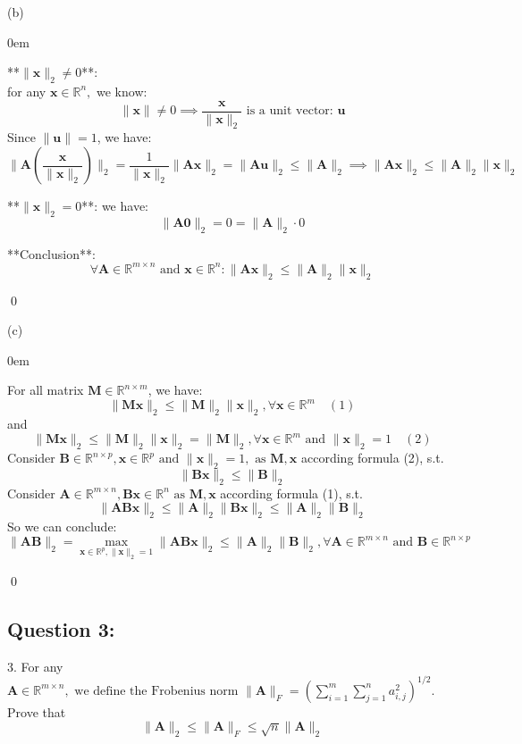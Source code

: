 \documentclass{article}
\newcommand{\R}{\mathbb{R}}
\renewenvironment{proof}{\begin{addmargin}[1em]{0em}\begin{newproof}}
{\end{newproof}\end{addmargin}\qed}
\begin{document}
(b)
\begin{proof}
    **\(\|\bm{x}\|_2 \neq 0\)**: \\
    for any \(\bm{x} \in \R^n, \) we know:
    \[
    \|\bm{x}\| \neq 0 \implies \frac{\bm{x}}{\|\bm{x}\|_2} \text{ is a unit vector: } \bm{u}
    \]
    Since \(\|\bm{u}\| = 1\), we have:
    \[
    \|\bm{A} (\frac{\bm{x}}{\|\bm{x}\|_2})\|_2 = \frac{1}{\|\bm{x}\|_2}\|\bm{A}\bm{x}\|_2 = \|\bm{A}\bm{u}\|_2 \leq \|\bm{A}\|_2 \implies \|\bm{A}\bm{x}\|_2 \leq \|\bm{A}\|_2\|\bm{x}\|_2
    \]

    **\(\|\bm{x}\|_2 = 0\)**:
    we have:
    \[
    \|\bm{A}\bm{0}\|_2 = 0 = \|\bm{A}\|_2 \cdot 0
    \]

    **Conclusion**:
    \[
    \forall \bm{A} \in \R^{m \times n} \text{ and } \bm{x} \in \R^n :
    \|\bm{A}\bm{x}\|_2 \leq \|\bm{A}\|_2\|\bm{x}\|_2
    \]

    
\end{proof}

(c)
\begin{proof}
    For all matrix \( \bm{M} \in \R^{n \times m}\), we have:
    \[
    \|\bm{M}\bm{x}\|_2 \leq \|\bm{M}\|_2\|\bm{x}\|_2 , \forall \bm{x} \in \R^m \quad (1)
    \]
    and 
    \[
    \|\bm{M}\bm{x}\|_2 \leq \|\bm{M}\|_2\|\bm{x}\|_2 = \|\bm{M}\|_2, \forall \bm{x} \in \R^m \text{ and } \|\bm{x}\|_2 = 1 \quad (2)
    \]
    Consider \(\bm{B} \in \R^{n \times p}, \bm{x} \in \R^p \text{ and } \|\bm{x}\|_2 = 1, \text{ as } \bm{M}, \bm{x} \) according formula (2), s.t.
    \[
    \|\bm{B}\bm{x}\|_2 \leq \|\bm{B}\|_2
    \]
    Consider \(\bm{A} \in \R^{m \times n}, \bm{B}\bm{x} \in \R^n \text{ as } \bm{M}, \bm{x} \) according formula (1), s.t.
    \[
    \|\bm{A}\bm{B}\bm{x}\|_2 \leq \|\bm{A}\|_2\|\bm{B}\bm{x}\|_2 \leq \|\bm{A}\|_2\|\bm{B}\|_2
    \]
    So we can conclude:
    \[
    \|\bm{A}\bm{B}\|_2 = \max_{\bm{x} \in \R^p, \|\bm{x}\|_2 = 1}\|\bm{A}\bm{B}\bm{x}\|_2 \leq \|\bm{A}\|_2\|\bm{B}\|_2, \forall \bm{A} \in \R^{m \times n} \text{ and } \bm{B} \in \R^{n \times p}
    \]
\end{proof}

\subsection*{Question 3:}
3. For any \(\bm{A} \in \R^{m \times n}, \text{ we define the Frobenius norm } \|\bm{A}\|_F = \left( \sum_{i=1}^m \sum_{j=1}^n a_{i, j}^2 \right)^{1/2} \). Prove that
    \[
    \|\bm{A}\|_2 \leq \|\bm{A}\|_F \leq \sqrt{n}\|\bm{A}\|_2
    \]
\end{document}
